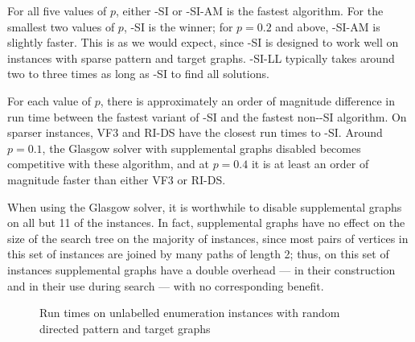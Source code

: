 For all five values of $p$, either \McSplit-SI or \McSplit-SI-AM is the fastest algorithm.  For
the smallest two values of $p$, \McSplit-SI is the winner; for $p=0.2$ and above, \McSplit-SI-AM
is slightly faster.  This is as we would expect, since \McSplit-SI is designed to work well
on instances with sparse pattern and target graphs.  
\McSplit-SI-LL typically takes around two to three times as long as \McSplit-SI to find all solutions.

For each value of $p$, there is approximately an order of magnitude difference in run time between
the fastest variant of \McSplit-SI and the fastest non-\McSplit-SI algorithm.
On sparser instances, VF3 and RI-DS have the closest run times to \McSplit-SI.  Around $p=0.1$,
the Glasgow solver with supplemental graphs disabled becomes competitive with these algorithm, and at $p=0.4$
it is at least an order of magnitude faster than either VF3 or RI-DS.

When using the Glasgow solver, it is worthwhile to disable supplemental graphs
on all but 11 of the instances.  In fact, supplemental graphs have no effect on
the size of the search tree on the majority of instances, since most pairs of
vertices in this set of instances are joined by many paths of length 2; thus,
on this set of instances supplemental graphs have a double overhead --- in
their construction and in their use during search --- with no corresponding
benefit.

\begin{figure}[h!]
    \centering
    \caption{Run times on unlabelled enumeration instances with random directed pattern and target graphs}
    \label{figure:unlabelled-vf-instance-runtimes}
\end{figure}

